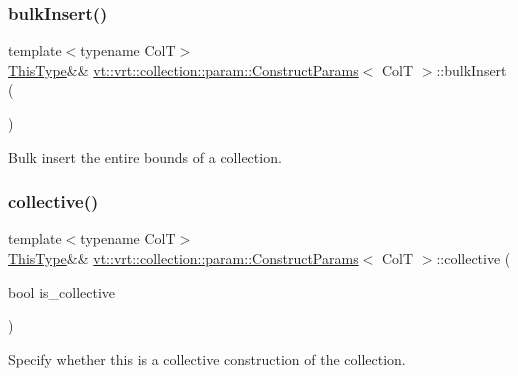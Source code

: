 \subsubsection{\texorpdfstring{bulk\+Insert()}{bulkInsert()}\hspace{0.1cm}{\footnotesize\ttfamily [2/2]}}
{\footnotesize\ttfamily template$<$typename ColT$>$ \\
\hyperlink{structvt_1_1vrt_1_1collection_1_1param_1_1_construct_params_a13d4910c0f6825c7b0ddfebce5288bea}{This\+Type}\&\& \hyperlink{structvt_1_1vrt_1_1collection_1_1param_1_1_construct_params}{vt\+::vrt\+::collection\+::param\+::\+Construct\+Params}$<$ ColT $>$\+::bulk\+Insert (\begin{DoxyParamCaption}{ }\end{DoxyParamCaption})\hspace{0.3cm}{\ttfamily [inline]}}



Bulk insert the entire bounds of a collection. 

\mbox{\label{structvt_1_1vrt_1_1collection_1_1param_1_1_construct_params_aded96b7d8b93f3ae8b91c419cbce6ddd}} 
\subsubsection{\texorpdfstring{collective()}{collective()}}
{\footnotesize\ttfamily template$<$typename ColT$>$ \\
\hyperlink{structvt_1_1vrt_1_1collection_1_1param_1_1_construct_params_a13d4910c0f6825c7b0ddfebce5288bea}{This\+Type}\&\& \hyperlink{structvt_1_1vrt_1_1collection_1_1param_1_1_construct_params}{vt\+::vrt\+::collection\+::param\+::\+Construct\+Params}$<$ ColT $>$\+::collective (\begin{DoxyParamCaption}\item[{bool}]{is\+\_\+collective }\end{DoxyParamCaption})\hspace{0.3cm}{\ttfamily [inline]}}



Specify whether this is a collective construction of the collection. 

